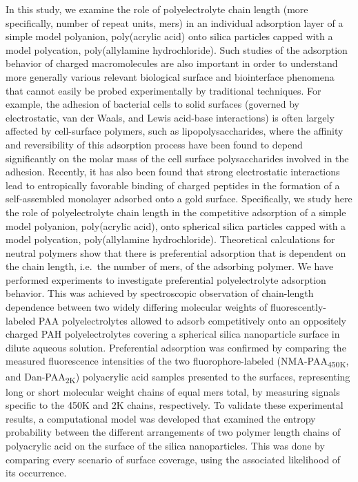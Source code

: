 \documentclass[journal=mamobx,manuscript=article]{achemso}
\begin{document}
In this study, we examine the role of polyelectrolyte chain length (more specifically, number of repeat units, mers) in an individual adsorption layer of a simple model polyanion, poly(acrylic acid) onto silica particles capped with a model polycation, poly(allylamine hydrochloride).  Such studies of the adsorption behavior of charged macromolecules are also important in order to understand more generally various relevant biological surface and biointerface phenomena that cannot easily be probed experimentally by traditional techniques.  For example, the adhesion of bacterial cells to solid surfaces (governed by electrostatic, van der Waals, and Lewis acid-base interactions) is often largely affected by cell-surface polymers, such as lipopolysaccharides,\cite{Jucker1997} where   the affinity and reversibility of this adsorption process have been found to depend significantly on the molar mass of the cell surface polysaccharides involved in the adhesion.\cite{Jucker1997}  
Recently, it has also been found that strong electrostatic interactions lead to entropically favorable binding of charged peptides in the formation of a self-assembled monolayer adsorbed onto a gold surface.\cite{Sprenger2016} 
Specifically, we study here the role of polyelectrolyte chain length in the competitive adsorption of a simple model polyanion, poly(acrylic acid), onto spherical silica particles capped with a model polycation, poly(allylamine hydrochloride). Theoretical calculations for neutral polymers show that there is preferential adsorption that is dependent on the chain length, i.e.\ the number of mers, of the adsorbing polymer. 
We have performed experiments to investigate preferential polyelectrolyte adsorption behavior. 
This was achieved by spectroscopic 
observation of chain-length dependence between two widely differing molecular weights of fluorescently-labeled PAA polyelectrolytes allowed to adsorb competitively onto an oppositely charged PAH polyelectrolytes covering a spherical silica nanoparticle surface in dilute aqueous solution. 
Preferential adsorption was confirmed by comparing the measured fluorescence intensities of the two fluorophore-labeled (NMA-PAA\textsubscript{450K}, and Dan-PAA\textsubscript{2K}) polyacrylic acid samples presented to the surfaces, representing long or short molecular weight chains of equal mers total, by measuring signals specific to the 450K and 2K chains, respectively. To validate these experimental results, a computational model was developed that examined the entropy probability between the different arrangements of two polymer length chains of polyacrylic acid on the surface of the silica nanoparticles. This was done by comparing every scenario of surface coverage, using the associated likelihood of its occurrence. 
\end{document}
